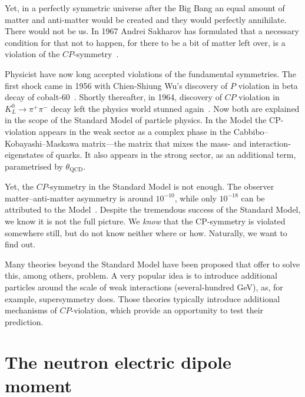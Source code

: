 Yet, in a perfectly symmetric universe after the Big Bang an equal amount of matter and anti-matter would be created and they would perfectly annihilate. There would not be us.
In 1967 Andrei Sakharov
has formulated that a necessary condition for that not to happen, for there to be a bit of matter left over, is a violation of the $CP$-symmetry~\cite{0038-5670-34-5-A08}.

Physicist have now long accepted violations of the fundamental symmetries.
The first shock came in 1956 with Chien-Shiung Wu's discovery of $P$ violation in beta decay of cobalt-60~\cite{PhysRev.105.1413}. Shortly thereafter, in 1964, discovery of $CP$ violation in $K^0_L \rightarrow \pi^+ \pi^-$ decay left the physics world stunned again~\cite{PhysRevLett.13.138}. Now both are explained in the scope of the Standard Model of particle physics. In the Model the CP-violation appears in the weak sector as a complex phase in the Cabbibo--Kobayashi--Maskawa matrix---the matrix that mixes the mass- and interaction-eigenstates of quarks. It also appears in the strong sector, as an additional term, parametrised by $\theta_\text{QCD}$. 

Yet, the $CP$-symmetry in the Standard Model is not enough. The observer matter--anti-matter asymmetry is around $10^{-10}$, while only $10^{-18}$ can be attributed to the Model~\cite{Riotto1999}. Despite the tremendous success of the Standard Model, we know it is not the full picture. We \emph{know} that the CP-symmetry is violated somewhere still, but do not know neither where or how. Naturally, we want to find out. %

Many theories beyond the Standard Model have been proposed that offer to solve this, among others, problem. A very popular idea is to introduce additional particles around the scale of weak interactions (several-hundred GeV), as, for example, supersymmetry does. Those theories typically introduce additional mechanisms of $CP$-violation, which provide an opportunity to test their prediction.



\section{The neutron electric dipole moment}

